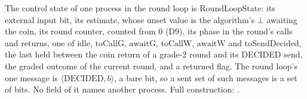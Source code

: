 \begin{definition}
  \label{def:aba-round-loop-state}
  \leanok
  The control state of one process in the round loop is $\mathrm{RoundLoopState}$: its external input bit, its estimate, whose unset value is the algorithm's $\bot$ awaiting the coin, its round counter, counted from $0$ (D9), its phase in the round's calls and returns, one of $\mathrm{idle}$, $\mathrm{toCallG}$, $\mathrm{awaitG}$, $\mathrm{toCallW}$, $\mathrm{awaitW}$ and $\mathrm{toSendDecided}$, the last held between the coin return of a grade-2 round and its DECIDED send, the graded outcome of the current round, and a returned flag.
  The round loop's one message is $\langle\mathrm{DECIDED},b\rangle$, a bare bit, so a sent set of such messages is a set of bits.
  No field of it names another process.
  Full construction: .
\end{definition}

